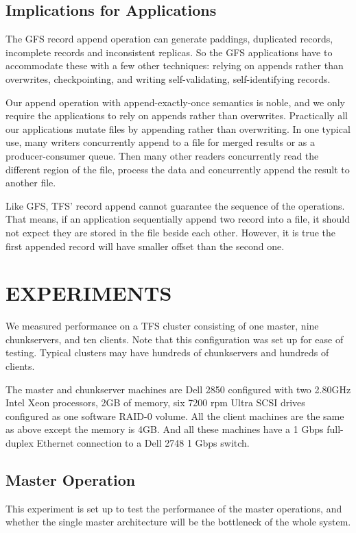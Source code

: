 \documentclass[letterpaper,twocolumn,10pt]{article}
\begin{document}
\subsection{Implications for Applications}
The GFS record append operation can generate paddings, duplicated records, incomplete records and inconsistent replicas. So the GFS applications have to accommodate these with a few other techniques: relying on appends rather than overwrites, checkpointing, and writing self-validating, self-identifying records.

Our append operation with append-exactly-once semantics is noble, and we only require the applications to rely on appends rather than overwrites. Practically all our applications mutate files by appending rather than overwriting. In one typical use, many writers concurrently append to a file for merged results or as a producer-consumer queue. Then many other readers concurrently read the different region of the file, process the data and concurrently append the result to another file. 

Like GFS, TFS' record append cannot guarantee the sequence of the operations. That means, if an application sequentially append two record into a file, it should not expect they are stored in the file beside each other. However, it is true the first appended record will have smaller offset than the second one. 
\section{EXPERIMENTS}
We measured performance on a TFS cluster consisting of one master, nine chunkservers, and ten clients. Note that this configuration was set up for ease of testing. Typical clusters may have hundreds of chunkservers and hundreds of clients.

The master and chunkserver machines are Dell 2850 configured with two 2.80GHz Intel Xeon processors, 2GB of memory, six 7200 rpm Ultra SCSI drives configured as one software RAID-0 volume. All the client machines are the same as above except the memory is 4GB. And all these machines have a 1 Gbps full-duplex Ethernet connection to a Dell 2748 1 Gbps switch. 

\subsection{Master Operation}
This experiment is set up to test the performance of the master operations, and whether the single master architecture will be the bottleneck of the whole system. 
\end{document}
